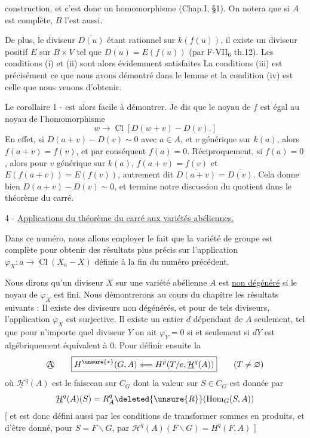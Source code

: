 construction, et c'est donc un homomorphisme (Chap.I, \S 1). On notera que si $A$ est complète, $B$ l'est aussi.

De plus, le diviseur $\overline{D(u)}$ étant rationnel sur $k(f(u))$, il existe un diviseur positif $E$ sur $B\times V$ tel que $\overline{D(u)}=E(f(u))$ (par F-VII$_6$ th.12). Les conditions (i) et (ii) sont alors évidemment satisfaites La conditions (iii) est précisément ce que nous avons démontré dans le lemme et la condition (iv) est celle que nous venons d'obtenir.

Le corollaire 1 - est alors facile à démontrer. Je dis que le noyau de $f$ est égal au noyau de l'homomorphisme
\[
w\longrightarrow\operatorname{Cl}[D(w+v)-D(v).]
\]
En effet, si $D(a+v)-D(v)\sim0$ avec $a\in A$, et $v$ générique sur $k(a)$, alors $f(a+v)=f(v)$, et par conséquent $f(a)=0$. Réciproquement, si $f(a)=0$, alors pour $v$ générique sur $k(a)$, $f(a+v)=f(v)$ et $E(f(a+v))=E(f(v))$, autrement dit $\overline{D(a+v)}=\overline{D(v)}$. Cela donne bien $D(a+v)-D(v)\sim0$, et termine notre discussion du quotient dans le théorème du carré.

4 - \uline{Applications du théorème du carré aux variétés abéliennes.}

Dans ce numéro, nous allons employer le fait que la variété de groupe est complète pour obtenir des résultats plus précis sur l'application $\varphi_X:a\longrightarrow\operatorname{Cl}(X_a-X)$ définie à la fin du numéro précédent.

Nous dirons qu'un diviseur $X$ sur une variété abélienne $A$ est \uline{non dégénéré} si le noyau de $\varphi_X$ est fini. Nous démontrerons au cours du chapitre les résultats suivants : Il existe des diviseurs non dégénérés, et pour de tels diviseurs, l'application $\varphi_X$ est surjective. Il existe un entier $d$ dépendant de $A$ seulement, tel que pour n'importe quel diviseur $Y$ on ait $\varphi_Y=0$ si et seulement si $dY$ est algébriquement équivalent à $0$. Pour définir ensuite la
\[\text{\textcircled{A}}\qquad\boxed{H^{\unsure{*}}(G,A)\Longleftarrow H^p(T/e,\underline{\mathcal H}^{q}(A))}\qquad(T\ne\varnothing)\]
où $\underline{\mathcal H}^{q}(A)$ est le faisceau sur $C_G$  dont la valeur sur $S\in C_G$ est donnée par
\[
\underline{\mathcal H}^{q}(A)(S)=R_A^q\deleted{\unsure{R}}(\operatorname{Hom}_{G}(S,A))
\]
[ et est donc défini aussi par les conditions de  transformer sommes  en produits, et d'être donné, pour $S=F\backslash G$, par $\mathcal H^q(A)(F\backslash G)=H^q(F,A)$ ]


